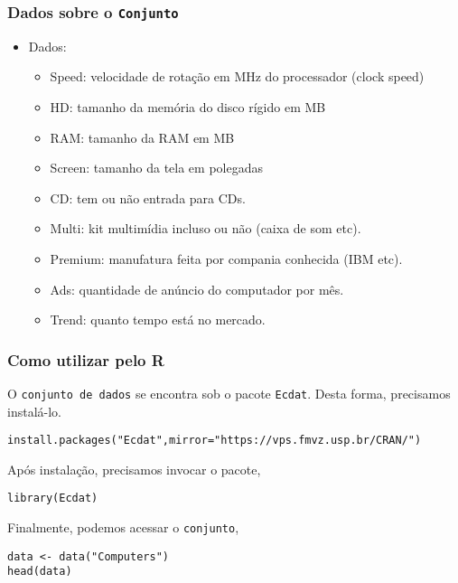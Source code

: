 \documentclass[11pt]{article}
\begin{document}
\subsubsection{Dados sobre o \texttt{Conjunto}}
\label{sec:org6ea9225}
\begin{itemize}
\item Dados:
\begin{itemize}
\item Speed: velocidade de rotação em MHz do processador (clock speed)
\item HD: tamanho da memória do disco rígido em MB
\item RAM: tamanho da RAM em MB
\item Screen: tamanho da tela em polegadas
\item CD: tem ou não entrada para CDs.
\item Multi: kit multimídia incluso ou não (caixa de som etc).
\item Premium: manufatura feita por compania conhecida (IBM etc).
\item Ads: quantidade de anúncio do computador por mês.
\item Trend: quanto tempo está no mercado.
\end{itemize}
\end{itemize}
\subsubsection{Como utilizar pelo R}
\label{sec:orgb633646}
O \texttt{conjunto de dados} se encontra sob o pacote \texttt{Ecdat}. Desta forma, precisamos
instalá-lo.

\begin{verbatim}
install.packages("Ecdat",mirror="https://vps.fmvz.usp.br/CRAN/")
\end{verbatim}

Após instalação, precisamos invocar o pacote,
\begin{verbatim}
library(Ecdat)
\end{verbatim}

Finalmente, podemos acessar o \texttt{conjunto},
\begin{verbatim}
data <- data("Computers")
head(data)
\end{verbatim}
\end{document}
